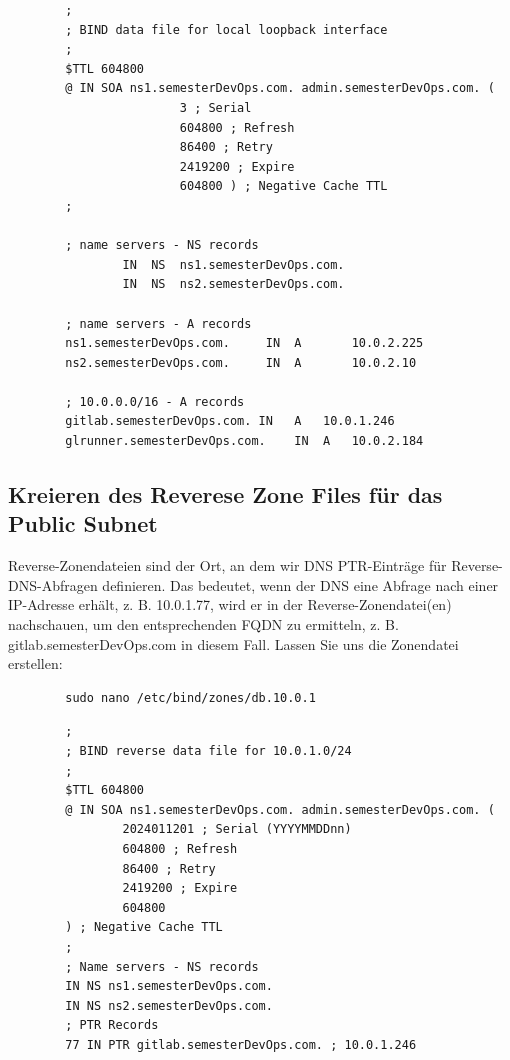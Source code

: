 \documentclass[a4paper,12pt]{article}
\begin{document}
\begin{verbatim}
		;
		; BIND data file for local loopback interface
		;
		$TTL 604800
		@ IN SOA ns1.semesterDevOps.com. admin.semesterDevOps.com. (
						3 ; Serial
						604800 ; Refresh
						86400 ; Retry
						2419200 ; Expire
						604800 ) ; Negative Cache TTL
		;

		; name servers - NS records
				IN	NS 	ns1.semesterDevOps.com.
				IN 	NS 	ns2.semesterDevOps.com.

		; name servers - A records
		ns1.semesterDevOps.com. 	IN	A		10.0.2.225
		ns2.semesterDevOps.com. 	IN	A		10.0.2.10

		; 10.0.0.0/16 - A records
		gitlab.semesterDevOps.com. IN 	A 	10.0.1.246
		glrunner.semesterDevOps.com. 	IN 	A 	10.0.2.184
\end{verbatim}


\subsection{Kreieren des Reverese Zone Files für das Public Subnet}
Reverse-Zonendateien sind der Ort, an dem wir DNS PTR-Einträge für Reverse-DNS-Abfragen definieren. 
Das bedeutet, wenn der DNS eine Abfrage nach einer IP-Adresse erhält, z. B. 10.0.1.77, wird er in der Reverse-Zonendatei(en) nachschauen, um den entsprechenden FQDN zu ermitteln, z. B. gitlab.semesterDevOps.com in diesem Fall.
Lassen Sie uns die Zonendatei erstellen:

\begin{verbatim}
		sudo nano /etc/bind/zones/db.10.0.1
\end{verbatim}
\begin{verbatim}
		;
		; BIND reverse data file for 10.0.1.0/24
		;
		$TTL 604800
		@ IN SOA ns1.semesterDevOps.com. admin.semesterDevOps.com. (
				2024011201 ; Serial (YYYYMMDDnn)
				604800 ; Refresh
				86400 ; Retry
				2419200 ; Expire
				604800 
		) ; Negative Cache TTL
		;
		; Name servers - NS records
		IN NS ns1.semesterDevOps.com.
		IN NS ns2.semesterDevOps.com.
		; PTR Records
		77 IN PTR gitlab.semesterDevOps.com. ; 10.0.1.246
\end{verbatim}
\end{document}

